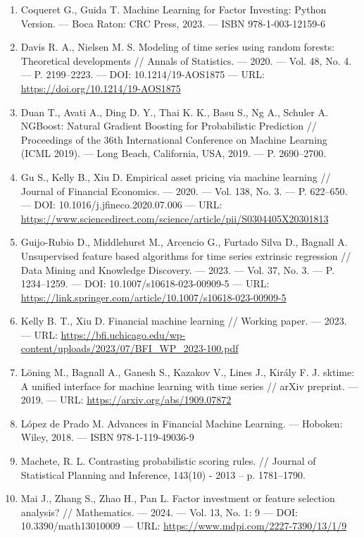 \documentclass[
]{article}
\begin{document}
\begin{enumerate}
\item
  Coqueret G., Guida T. Machine Learning for Factor Investing: Python Version. --- Boca Raton: CRC Press, 2023. --- ISBN 978-1-003-12159-6
\item
  Davis R. A., Nielsen M. S. Modeling of time series using random forests: Theoretical developments // Annals of Statistics. --- 2020. --- Vol. 48, No. 4. --- P. 2199--2223. --- DOI: 10.1214/19-AOS1875 --- URL: \url{https://doi.org/10.1214/19-AOS1875}
\item
  Duan T., Avati A., Ding D. Y., Thai K. K., Basu S., Ng A., Schuler A. NGBoost: Natural Gradient Boosting for Probabilistic Prediction // Proceedings of the 36th International Conference on Machine Learning (ICML 2019). --- Long Beach, California, USA, 2019. --- P. 2690--2700.
\item
  Gu S., Kelly B., Xiu D. Empirical asset pricing via machine learning // Journal of Financial Economics. --- 2020. --- Vol. 138, No. 3. --- P. 622--650. --- DOI: 10.1016/j.jfineco.2020.07.006 --- URL: \url{https://www.sciencedirect.com/science/article/pii/S0304405X20301813}
\item
  Guijo-Rubio D., Middlehurst M., Arcencio G., Furtado Silva D., Bagnall A. Unsupervised feature based algorithms for time series extrinsic regression // Data Mining and Knowledge Discovery. --- 2023. --- Vol. 37, No. 3. --- P. 1234--1259. --- DOI: 10.1007/s10618-023-00909-5 --- URL: \url{https://link.springer.com/article/10.1007/s10618-023-00909-5}
\item
  Kelly B. T., Xiu D. Financial machine learning // Working paper. --- 2023. --- URL: \url{https://bfi.uchicago.edu/wp-content/uploads/2023/07/BFI_WP_2023-100.pdf}
\item
  Löning M., Bagnall A., Ganesh S., Kazakov V., Lines J., Király F. J. sktime: A unified interface for machine learning with time series // arXiv preprint. --- 2019. --- URL: \url{https://arxiv.org/abs/1909.07872}
\item
  López de Prado M. Advances in Financial Machine Learning. --- Hoboken: Wiley, 2018. --- ISBN 978-1-119-49036-9
\item
  Machete, R. L. Contrasting probabilistic scoring rules. // Journal of Statistical Planning and Inference, 143(10) - 2013 -- p. 1781--1790.
\item
  Mai J., Zhang S., Zhao H., Pan L. Factor investment or feature selection analysis? // Mathematics. --- 2024. --- Vol. 13, No. 1: 9 --- DOI: 10.3390/math13010009 --- URL: \url{https://www.mdpi.com/2227-7390/13/1/9}

\end{enumerate}
\end{document}
